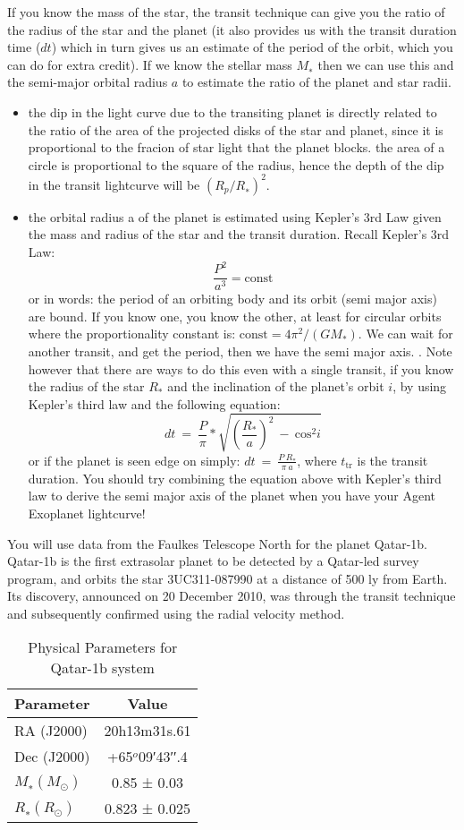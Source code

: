 If you know the mass of the star, the transit technique can give you the ratio of the radius of the star and the planet (it also provides us with the transit duration time ($dt$) which in turn gives us an estimate of the period of the orbit, which you can do for extra credit). If we know the stellar mass $M_∗$ then we can use this and the semi-major orbital radius $a$ to estimate the ratio of the planet and star radii.
\begin{itemize}
\item
the dip in the light curve due to the transiting planet is directly related to the ratio of the area of the projected disks of the star and planet, since it is proportional to the fracion of star light that the planet blocks. the area of a circle is proportional to the square of the radius, hence the depth of the dip in the transit lightcurve will be  $(R_p/R_∗)^2$.
\item
the orbital radius a of the planet is estimated using Kepler’s 3rd Law given the mass and radius of the star and the transit duration. 
Recall Kepler’s 3rd Law:
$$\frac{P^2}{a^3}=\mathrm{const}$$
or in words: the period of an orbiting body and its orbit (semi major axis) are bound. If you know one, you know the other, at least for circular orbits where the proportionality constant is: $\mathrm{const} = 4\pi^2/(GM_*)$.
We can wait for another transit, and get the period, then we have the semi major axis. . 
Note however that there are ways to do this even with a single transit, if you know the radius of the star $R_*$  and the inclination of the planet's orbit $i$, by using Kepler's third law and the following equation:
$$ dt~=~\frac{P}{\pi}*\sqrt{\left(\frac{R_*}{a}\right)^2 ~-~\mathrm{cos}^2 i} $$
\noindent
or if the planet is seen edge on simply: $dt~=~\frac{P~R_*}{\pi~a}$, where $t_\mathrm{tr}$ is the transit duration. You should try combining the equation above with Kepler's third law to derive the semi major axis of the planet when you have your Agent Exoplanet lightcurve!
\end{itemize}

You will use data from the Faulkes Telescope North for the planet
Qatar-1b. Qatar-1b is the first extrasolar planet to be detected by a
Qatar-led survey program, and orbits the star 3UC311-087990 at a
distance of 500 ly from Earth. Its discovery, announced on 20 December
2010, was through the transit technique and subsequently confirmed
using the radial velocity method.
\begin{table}
\begin{center}
\begin{tabular}{lc}
Parameter & Value\\
\hline
RA (J2000) & 20h13m31s.61\\
Dec (J2000) & +65$^o$09′43′′.4\\
$M_∗ (M_\odot)$ & 0.85 ± 0.03 \\
$R_∗ (R_\odot)$ & 0.823 ± 0.025 
\end{tabular}\caption{Physical Parameters for Qatar-1b system}
\end{center}
\end{table}

